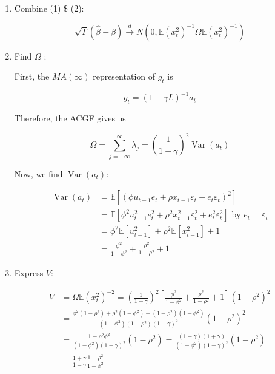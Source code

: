 {{\begin{enumerate}[label=(\alph*)]
{\begin{enumerate}[label=(\arabic*)]
$$
\begin{aligned}
\left(\frac{1}{T} \sum x_{t}^{2}\right)^{-1} & \xrightarrow{p} \mathbb{E}\left(x_{t}^{2}\right)^{-1}=1-\rho^{2} \quad \text{by LLN \& CMT}\\
\frac{1}{\sqrt{T}} \sum {g_t} & \xrightarrow{d} N(0, \Omega) \quad \text{by CLT}
\end{aligned}
$$

\item Combine (1) \$ (2):

$$
\sqrt{T}(\hat{\beta}-\beta) \xrightarrow{d} N\left(0, \mathbb{E}\left(x_{t}^{2}\right)^{-1} \Omega \mathbb{E}\left(x_{t}^{2}\right)^{-1}\right)
$$
\item Find $\Omega$ :

First, the $MA (\infty)$ representation of $g_{t}$ is

$$
g_{t}=(1-\gamma L)^{-1} a_{t}
$$

Therefore, the ACGF gives us

$$
\Omega=\sum_{j=-\infty}^{\infty} \lambda_{j}=\left(\frac{1}{1-\gamma}\right)^{2} \operatorname{Var}\left(a_{t}\right)
$$

Now, we find $\operatorname{Var}\left(a_{t}\right)$:

$$
\begin{aligned}
\operatorname{Var}\left(a_{t}\right) & =\mathbb{E}\left[\left(\phi u_{t-1} e_{t}+\rho x_{t-1} \varepsilon_{t}+e_{t} \varepsilon_{t}\right)^{2}\right] \\
& =\mathbb{E}\left[\phi^{2} u_{t-1}^{2} e_{t}^{2}+\rho^{2} x_{t-1}^{2} \varepsilon_{t}^{2}+e_{t}^{2} \varepsilon_{t}^{2}\right] \text { by } e_{t} \perp \varepsilon_{t} \\
& =\phi^{2} \mathbb{E}\left[u_{t-1}^{2}\right]+\rho^{2} \mathbb{E}\left[x_{t-1}^{2}\right]+1 \\
& =\frac{\phi^{2}}{1-\phi^{2}}+\frac{\rho^{2}}{1-\rho^{2}}+1
\end{aligned}
$$
\item Express $V$:

$$
\begin{aligned}
V & =\Omega \mathbb{E}\left(x_{t}^{2}\right)^{-2}=\left(\frac{1}{1-\gamma}\right)^{2}\left[\frac{\phi^{2}}{1-\phi^{2}}+\frac{\rho^{2}}{1-\rho^{2}}+1\right]\left(1-\rho^{2}\right)^{2} \\
& =\frac{\phi^{2}\left(1-\rho^{2}\right)+\rho^{2}\left(1-\phi^{2}\right)+\left(1-\rho^{2}\right)\left(1-\phi^{2}\right)}{\left(1-\phi^{2}\right)\left(1-\rho^{2}\right)(1-\gamma)^{2}}\left(1-\rho^{2}\right)^{2} \\
& =\frac{1-\rho^{2} \phi^{2}}{\left(1-\phi^{2}\right)(1-\gamma)^{2}}\left(1-\rho^{2}\right)=\frac{(1-\gamma)(1+\gamma)}{\left(1-\phi^{2}\right)(1-\gamma)^{2}}\left(1-\rho^{2}\right) \\
& =\frac{1+\gamma}{1-\gamma} \frac{1-\rho^{2}}{1-\phi^{2}}
\end{aligned}
$$
\end{enumerate}
}
\end{enumerate}
}
{
}}

